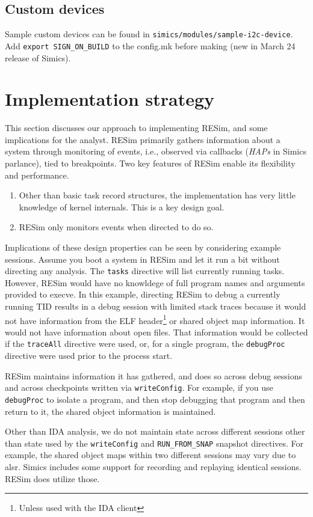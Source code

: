 \documentclass[titlepage]{article}
\begin{document}
\subsection{Custom devices}
Sample custom devices can be found in {\tt simics/modules/sample-i2c-device}.
Add {\tt export SIGN\_ON\_BUILD} to the config.mk before making (new in March 24 release of Simics).


\section{Implementation strategy}
\label{implementation}
This section discusses our approach to implementing RESim, and some implications for the analyst.
RESim primarily gathers information about a system through monitoring of events, i.e., observed via callbacks (\textit{HAPs} in Simics parlance), tied to 
breakpoints.  Two key features of RESim enable its flexibility and performance.  

\begin{enumerate}
\item Other than basic task record structures, the implementation has very little knowledge of kernel internals.
This is a key design goal.  
\item RESim only monitors events when directed to do so.
\end{enumerate}
\noindent Implications of these design properties can be seen by considering example sessions.  Assume you boot a system in RESim and let it run a bit without
directing any analysis.  The {\tt tasks} directive will list currently running tasks.  However, RESim would have no knowldege of full program names and arguments
provided to execve.  In this example, directing RESim to debug a currently running TID results in a debug session with limited stack traces because
it would not have information from the ELF header\footnote{Unless used with the IDA client}  or shared object map information.  It would not have
information about open files.
That information would be collected if the {\tt traceAll} directive were used, or, for a single program, the {\tt debugProc} directive were used prior to the
process start.

RESim maintains information it has gathered, and does so across debug sessions and across checkpoints written via {\tt writeConfig}.  For example, if you
use {\tt debugProc} to isolate a program, and then stop debugging that program and then return to it, the shared object information is maintained.

Other than IDA analysis, we do not maintain state across different sessions other than state used by the {\tt writeConfig} and {\tt RUN\_FROM\_SNAP} snapshot directives.
For example, the shared object maps within two different sessions may vary due to alsr.  Simics includes some support for recording and replaying identical sessions.  
RESim does utilize those.
\end{document}
